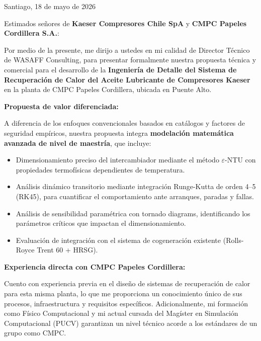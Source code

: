 \documentclass[11pt,a4paper]{article}
\begin{document}
\begin{flushright}
Santiago, 18 de mayo de 2026
\end{flushright}

\vspace{0.5cm}

Estimados señores de \textbf{Kaeser Compresores Chile SpA} y \textbf{CMPC Papeles Cordillera S.A.}:

\vspace{0.5cm}

Por medio de la presente, me dirijo a ustedes en mi calidad de Director Técnico de WASAFF Consulting, para presentar formalmente nuestra propuesta técnica y comercial para el desarrollo de la \textbf{Ingeniería de Detalle del Sistema de Recuperación de Calor del Aceite Lubricante de Compresores Kaeser} en la planta de CMPC Papeles Cordillera, ubicada en Puente Alto.

\textbf{Propuesta de valor diferenciada:}

A diferencia de los enfoques convencionales basados en catálogos y factores de seguridad empíricos, nuestra propuesta integra \textbf{modelación matemática avanzada de nivel de maestría}, que incluye:

\begin{itemize}
  \item Dimensionamiento preciso del intercambiador mediante el método $\varepsilon$-NTU con propiedades termofísicas dependientes de temperatura.
  \item Análisis dinámico transitorio mediante integración Runge-Kutta de orden 4--5 (RK45), para cuantificar el comportamiento ante arranques, paradas y fallas.
  \item Análisis de sensibilidad paramétrica con tornado diagrams, identificando los parámetros críticos que impactan el dimensionamiento.
  \item Evaluación de integración con el sistema de cogeneración existente (Rolls-Royce Trent 60 + HRSG).
\end{itemize}

\textbf{Experiencia directa con CMPC Papeles Cordillera:}

Cuento con experiencia previa en el diseño de sistemas de recuperación de calor para esta misma planta, lo que me proporciona un conocimiento único de sus procesos, infraestructura y requisitos específicos. Adicionalmente, mi formación como Físico Computacional y mi actual cursada del Magíster en Simulación Computacional (PUCV) garantizan un nivel técnico acorde a los estándares de un grupo como CMPC.
\end{document}

